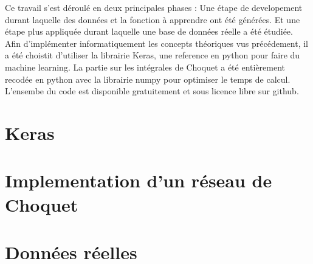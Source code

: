 Ce travail s'est déroulé en deux principales phases :
Une étape de developement durant laquelle des données et la fonction à apprendre ont été générées.
Et une étape plus appliquée durant laquelle une base de données réelle a été étudiée.\\


Afin d'implémenter informatiquement les concepts théoriques vus précédement,
il a été choistit d'utiliser la librairie Keras\cite{keras}, une reference en python pour faire du machine learning.
La partie sur les intégrales de Choquet a été entièrement recodée en python
avec la librairie numpy\cite{numpy} pour optimiser le temps de calcul.
L'ensembe du code est disponible gratuitement et sous licence libre sur github\cite{repoStage}.

\section{Keras}\label{sec:keras}


\newpage
\section{Implementation d'un réseau de Choquet}\label{sec:implementation-Choquet}


\newpage
\section{Données réelles}\label{sec:données-réelles}


